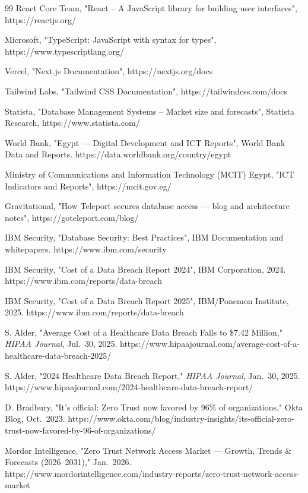 \documentclass[12pt,a4paper]{report}
\begin{document}
\begin{thebibliography}{99}
React Core Team, "React – A JavaScript library for building user interfaces", https://reactjs.org/

Microsoft, "TypeScript: JavaScript with syntax for types", https://www.typescriptlang.org/

Vercel, "Next.js Documentation", https://nextjs.org/docs

Tailwind Labs, "Tailwind CSS Documentation", https://tailwindcss.com/docs

Statista, "Database Management Systems – Market size and forecasts", Statista Research, https://www.statista.com/

World Bank, "Egypt — Digital Development and ICT Reports", World Bank Data and Reports. https://data.worldbank.org/country/egypt

Ministry of Communications and Information Technology (MCIT) Egypt, "ICT Indicators and Reports", https://mcit.gov.eg/

Gravitational, "How Teleport secures database access — blog and architecture notes", https://goteleport.com/blog/

IBM Security, "Database Security: Best Practices", IBM Documentation and whitepapers. https://www.ibm.com/security

IBM Security, "Cost of a Data Breach Report 2024", IBM Corporation, 2024. https://www.ibm.com/reports/data-breach

IBM Security, "Cost of a Data Breach Report 2025", IBM/Ponemon Institute, 2025. https://www.ibm.com/reports/data-breach

S. Alder, "Average Cost of a Healthcare Data Breach Falls to \$7.42 Million," \textit{HIPAA Journal}, Jul.\ 30, 2025. https://www.hipaajournal.com/average-cost-of-a-healthcare-data-breach-2025/

S. Alder, "2024 Healthcare Data Breach Report," \textit{HIPAA Journal}, Jan.\ 30, 2025. https://www.hipaajournal.com/2024-healthcare-data-breach-report/

D. Bradbury, "It's official: Zero Trust now favored by 96\% of organizations," Okta Blog, Oct.\ 2023. https://www.okta.com/blog/industry-insights/its-official-zero-trust-now-favored-by-96-of-organizations/

Mordor Intelligence, "Zero Trust Network Access Market --- Growth, Trends \& Forecasts (2026--2031)," Jan.\ 2026. https://www.mordorintelligence.com/industry-reports/zero-trust-network-access-market


\end{thebibliography}
\end{document}
